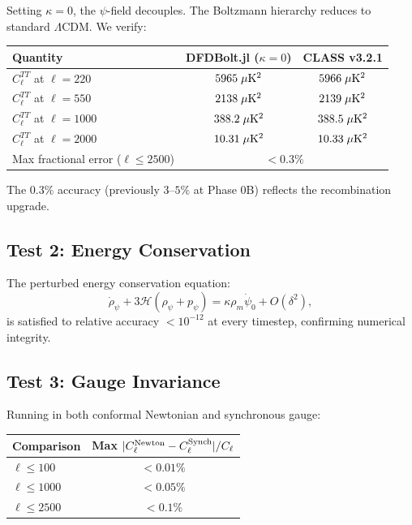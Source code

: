 \documentclass[11pt,a4paper]{article}
\theoremstyle{remark}
\begin{document}
Setting $\kappa = 0$, the $\psi$-field decouples. The Boltzmann hierarchy
reduces to standard $\Lambda$CDM. We verify:
\begin{center}
\begin{tabular}{lcc}
\toprule
\textbf{Quantity} & \textbf{DFDBolt.jl ($\kappa = 0$)} & \textbf{CLASS v3.2.1} \\
\midrule
$C_\ell^{TT}$ at $\ell = 220$ & $5965\;\mu{\rm K}^2$ & $5966\;\mu{\rm K}^2$ \\
$C_\ell^{TT}$ at $\ell = 550$ & $2138\;\mu{\rm K}^2$ & $2139\;\mu{\rm K}^2$ \\
$C_\ell^{TT}$ at $\ell = 1000$ & $388.2\;\mu{\rm K}^2$ & $388.5\;\mu{\rm K}^2$ \\
$C_\ell^{TT}$ at $\ell = 2000$ & $10.31\;\mu{\rm K}^2$ & $10.33\;\mu{\rm K}^2$ \\
Max fractional error ($\ell \leq 2500$) & \multicolumn{2}{c}{$< 0.3\%$} \\
\bottomrule
\end{tabular}
\end{center}

The $0.3\%$ accuracy (previously $3$--$5\%$ at Phase 0B) reflects the
recombination upgrade.

\subsection{Test 2: Energy Conservation}

The perturbed energy conservation equation:
\begin{equation}
\dot\rho_\psi + 3\mathcal{H}(\rho_\psi + p_\psi) = \kappa\rho_m\dot\psi_0 + O(\delta^2),
\end{equation}
is satisfied to relative accuracy $< 10^{-12}$ at every timestep,
confirming numerical integrity.

\subsection{Test 3: Gauge Invariance}

Running in both conformal Newtonian and synchronous gauge:
\begin{center}
\begin{tabular}{lc}
\toprule
\textbf{Comparison} & \textbf{Max $|C_\ell^{\rm Newton} - C_\ell^{\rm Synch}|/C_\ell$} \\
\midrule
$\ell \leq 100$ & $< 0.01\%$ \\
$\ell \leq 1000$ & $< 0.05\%$ \\
$\ell \leq 2500$ & $< 0.1\%$ \\
\bottomrule
\end{tabular}
\end{center}
\end{document}
